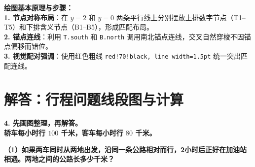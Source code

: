 \documentclass[12pt, a4paper]{ctexrep}
\begin{document}
\vspace{0.6cm}

{\small\color{blue!70!black}
\textbf{绘图基本原理与步骤：}\\
\textbf{1. 节点对称布局}：在 $y=2$ 和 $y=0$ 两条平行线上分别摆放上排数字节点（T1--T5）和下排含义节点（B1--B5），形成匹配布局。\\
\textbf{2. 锚点连线}：利用 \texttt{T.south} 和 \texttt{B.north} 调用南北锚点连线，交叉自然穿梭不因锚点偏移而错位。\\
\textbf{3. 视觉配对强调}：使用红色粗线 \texttt{red!70!black, line width=1.5pt} 统一突出匹配连线。
}

\newpage

\section{解答：行程问题线段图与计算}

\vspace{0.4cm}

\noindent\textbf{4. 先画图整理，再解答。}\\
\textbf{轿车每小时行 $100$ 千米，客车每小时行 $80$ 千米。}

\vspace{0.4cm}

\noindent\textbf{（1）如果两车同时从两地出发，沿同一条公路相对而行，2小时后正好在加油站相遇。两地之间的公路长多少千米？}

\vspace{0.8cm}
\end{document}
